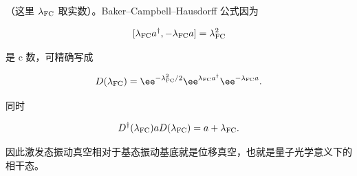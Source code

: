 （这里 \(\lambda_{\rm FC}\) 取实数）。Baker--Campbell--Hausdorff 公式因为

\[
[\lambda_{\rm FC} a^\dagger,-\lambda_{\rm FC} a]=\lambda_{\rm FC}^2
\]

是 c 数，可精确写成

\begin{equation}
D(\lambda_{\rm FC})
=\ee^{-\lambda_{\rm FC}^2/2}
 \ee^{\lambda_{\rm FC} a^\dagger}
 \ee^{-\lambda_{\rm FC} a}.
\label{eq:displacement-normal-order}
\end{equation}

同时

\[
D^\dagger(\lambda_{\rm FC})aD(\lambda_{\rm FC})=a+\lambda_{\rm FC}.
\]

因此激发态振动真空相对于基态振动基底就是位移真空，也就是量子光学意义下的相干态。

